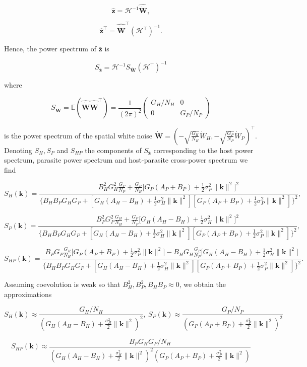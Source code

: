 \documentclass{article}
\begin{document}
\[\hat{\pmb z}=\mathscr H^{-1}\widehat{\dot{\pmb W}},\]

\[\hat{\pmb z}^\top=\widehat{\dot{\pmb W}}^\top\left(\mathscr H^\top\right)^{-1}.\]

Hence, the power spectrum of \(\bar{\pmb z}\) is

\[S_{\bar{\pmb z}}=\mathscr H^{-1}S_{\dot{\pmb W}}\left(\mathscr H^\top\right)^{-1}\]

where

\[S_{\dot{\pmb W}}=\mathbb E\left(\widehat{\dot{\pmb W}}\widehat{\dot{\pmb W}}^\top\right)=\frac{1}{(2\pi)^2}\left(\begin{matrix}G_H/N_H & 0 \\ 0 & G_P/N_P \end{matrix}\right)\]

is the power spectrum of the spatial white noise
\(\dot{\pmb W}=\left(-\sqrt{\tfrac{G_H}{N_H}}{\dot W}_H, -\sqrt{\tfrac{G_P}{N_P}}{\dot W}_P\right)^\top\).
Denoting \(S_H,S_P\) and \(S_{HP}\) the components of
\(S_{\bar{\pmb z}}\) corresponding to the host power spectrum, parasite
power spectrum and host-parasite cross-power spectrum we find

\[S_H(\pmb k)=\frac{B_H^2G_H^2\frac{G_P}{N_P}+\frac{G_H}{N_H}\big[G_P(A_P+B_P)+\frac{1}{2}\sigma_P^2\|\pmb k\|^2\big]^2}{\big\{B_HB_PG_HG_P+[G_H(A_H-B_H)+\frac{1}{2}\sigma_H^2\|\pmb k\|^2][G_P(A_P+B_P)+\frac{1}{2}\sigma_P^2\|\pmb k\|^2]\big\}^2},\]

\[S_P(\pmb k)=\frac{B_P^2G_P^2\frac{G_H}{N_H}+\frac{G_P}{N_P}\big[G_H(A_H-B_H)+\frac{1}{2}\sigma_H^2\|\pmb k\|^2\big]^2}{\big\{B_HB_PG_HG_P+[G_H(A_H-B_H)+\frac{1}{2}\sigma_H^2\|\pmb k\|^2][G_P(A_P+B_P)+\frac{1}{2}\sigma_P^2\|\pmb k\|^2]\big\}^2},\]

\[S_{HP}(\pmb k)=\frac{B_PG_P\frac{G_H}{N_H}\big[G_P(A_P+B_P)+\frac{1}{2}\sigma_P^2\|\pmb k\|^2\big]-B_HG_H\frac{G_P}{N_P}\big[G_H(A_H-B_H)+\frac{1}{2}\sigma_H^2\|\pmb k\|^2\big]}{\big\{B_HB_PG_HG_P+[G_H(A_H-B_H)+\frac{1}{2}\sigma_H^2\|\pmb k\|^2][G_P(A_P+B_P)+\frac{1}{2}\sigma_P^2\|\pmb k\|^2]\big\}^2}.\]

Assuming coevolution is weak so that \(B_H^2,B_P^2,B_HB_P\approx0\), we
obtain the approximations

\[S_H(\pmb k)\approx\frac{G_H/N_H}{\left(G_H(A_H-B_H)+\frac{\sigma_H^2}{2}\|\pmb k\|^2\right)^2}, \ S_P(\pmb k)\approx\frac{G_P/N_P}{\left(G_P(A_P+B_P)+\frac{\sigma_P^2}{2}\|\pmb k\|^2\right)^2}\]

\[S_{HP}(\pmb k)\approx\frac{B_PG_HG_P/N_H}{\left(G_H(A_H-B_H)+\frac{\sigma_H^2}{2}\|\pmb k\|^2\right)^2\left(G_P(A_P+B_P)+\frac{\sigma_P^2}{2}\|\pmb k\|^2\right)}\]
\end{document}
